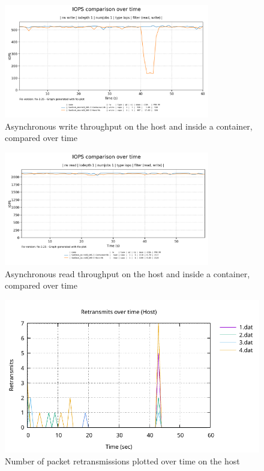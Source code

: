 \begin{figure}[H]
    \centering
    \includegraphics[width=0.8\textwidth]{images/results/sandisk-libaio-iops-write-comparison.png}
    \caption{Asynchronous write throughput on the host and inside a container, compared over time}
    \label{images:fundamentals/net-ns-veth-arch.jpg}
\end{figure}

\begin{figure}[H]
    \centering
    \includegraphics[width=0.8\textwidth]{images/results/sandisk-libaio-iops-read-comparison.png}
    \caption{Asynchronous read throughput on the host and inside a container, compared over time}
    \label{images:fundamentals/net-ns-veth-arch.jpg}
\end{figure}

\begin{figure}[H]
    \centering
    \includegraphics[width=1\textwidth]{images/results/network-host-retransmits.pdf}
    \caption{Number of packet retransmissions plotted over time on the host}
    \label{ticket-builder-class}
\end{figure}

